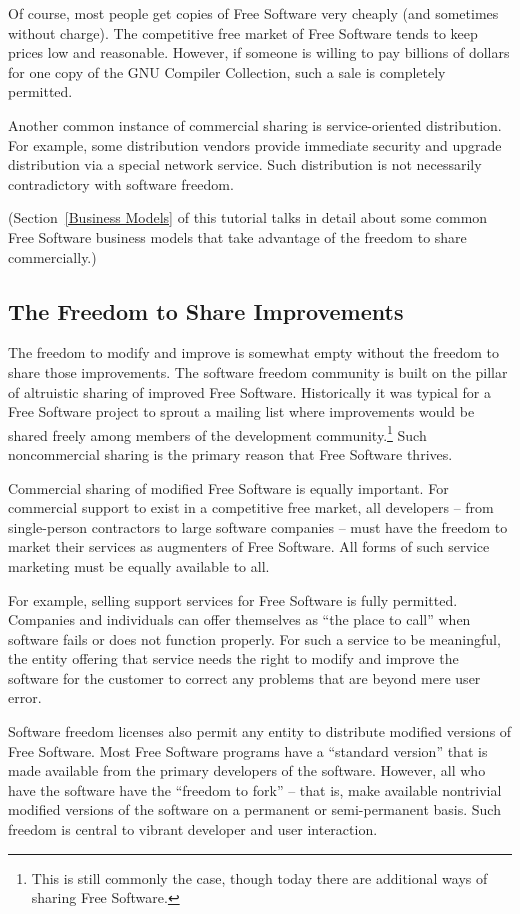 Of course, most people get copies of Free Software very cheaply (and
sometimes without charge).  The competitive free market of Free Software
tends to keep prices low and reasonable.  However, if someone is willing to
pay billions of dollars for one copy of the GNU Compiler Collection, such a
sale is completely permitted.

Another common instance of commercial sharing is service-oriented
distribution.  For example, some distribution vendors provide immediate
security and upgrade distribution via a special network service.  Such
distribution is not necessarily contradictory with software freedom.

(Section~\ref{Business Models} of this tutorial talks in detail about some
common Free Software business models that take advantage of the freedom to
share commercially.)

\subsection{The Freedom to Share Improvements}

The freedom to modify and improve is somewhat empty without the freedom to
share those improvements.  The software freedom community is built on the
pillar of altruistic sharing of improved Free Software. Historically
it was typical for a
Free Software project to sprout a mailing list where improvements
would be shared
freely among members of the development community.\footnote{This is still
commonly the case, though today there are additional ways of
sharing Free Software.}  Such noncommercial
sharing is the primary reason that Free Software thrives.

Commercial sharing of modified Free Software is equally important.
For commercial support to exist in a competitive free market, all
developers -- from single-person contractors to large software
companies -- must have the freedom to market their services as
augmenters of Free Software.  All forms of such service marketing must
be equally available to all.

For example, selling support services for Free Software is fully
permitted. Companies and individuals can offer themselves as ``the place
to call'' when software fails or does not function properly.  For such a
service to be meaningful, the entity offering that service needs the
right to modify and improve the software for the customer to correct any
problems that are beyond mere user error.

Software freedom licenses also permit any entity to distribute modified
versions of Free Software.  Most Free Software programs have a ``standard
version'' that is made available from the primary developers of the software.
However, all who have the software have the ``freedom to fork'' -- that is,
make available nontrivial modified versions of the software on a permanent or
semi-permanent basis.  Such freedom is central to vibrant developer and user
interaction.

